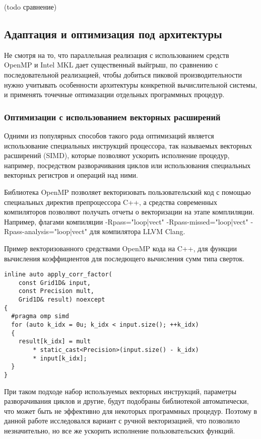(todo сравнение)

\subsection{Адаптация и оптимизация под архитектуры}
Не смотря на то, что параллельная реализация с использованием средств OpenMP и Intel MKL дает существенный выйгрыш,
по сравнению с последовательной реализацией, чтобы добиться пиковой производительности нужно учитывать особенности
архитектуры конкретной вычислительной системы, и применять точечные оптимазации отдельных программных процедур.

\subsubsection{Оптимизации с использованием векторных расширений}

Одними из популярных способов такого рода оптимизаций является использование специальных инструкций процессора,
так называемых векторных расширений (SIMD), которые позволяют ускорить исполнение процедур, например, посредством
разворачивания циклов или использования специальных векторных регистров и операций над ними.

Библиотека OpenMP позволяет векторизовать пользовательский код с помощью специальных директив препроцессора C++, а средства
современных компиляторов позволяют получать отчеты о векторизации на этапе комплиляции.
Например, флагами компиляции -Rpass="loop|vect" -Rpass-missed="loop|vect" -Rpass-analysis="loop|vect" для компилятора LLVM Clang.

Пример векторизованного средствами OpenMP кода на C++, для функции вычисления коэффициентов для последющего вычисления сумм типа сверток.

\begin{lstlisting}[style={CppCodeStyle}]
inline auto apply_corr_factor(
	const Grid1D& input,
	const Precision mult,
	Grid1D& result) noexcept
{
  #pragma omp simd
  for (auto k_idx = 0u; k_idx < input.size(); ++k_idx)
  {
    result[k_idx] = mult 
    	* static_cast<Precision>(input.size() - k_idx)
    	* input[k_idx];
  }
}
\end{lstlisting}

При таком подходе набор используемых векторных инструкций, параметры разворачивания циклов и другие, будут подобраны библиотекой автоматически,
что может быть не эффективно для некоторых программных процедур. Поэтому в данной работе исследовался вариант с ручной векторизацией,
что позволило незначительно, но все же ускорить исполнение пользовательских функций.

